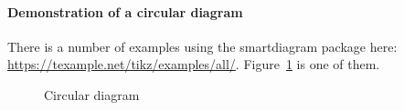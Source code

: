 \paragraph{Demonstration of a circular diagram}
There is a number of examples using the smartdiagram package here: \url{https://texample.net/tikz/examples/all/}. Figure~\ref{fig:flowchart3} is one of them.
\begin{figure}
	\centering
	\caption{Circular diagram}
	\label{fig:flowchart3}
\end{figure}
